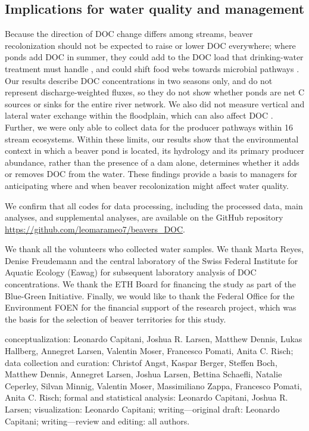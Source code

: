 \documentclass[pdflatex,sn-nature]{sn-jnl}   %
\begin{document}
\FloatBarrier
\subsection{Implications for water quality and management}

Because the direction of DOC change differs among streams, beaver recolonization should not be expected to raise or lower DOC everywhere; where ponds add DOC in summer, they could add to the DOC load that drinking-water treatment must handle \cite{leonard2022}, and could shift food webs towards microbial pathways \cite{stanley2012,xenopoulos2017}. Our results describe DOC concentrations in two seasons only, and do not represent discharge-weighted fluxes, so they do not show whether ponds are net C sources or sinks for the entire river network. We also did not measure vertical and lateral water exchange within the floodplain, which can also affect DOC \cite{larsen2021}. Further, we were only able to collect data for the producer pathways within 16 stream ecosystems. Within these limits, our results show that the environmental context in which a beaver pond is located, its hydrology and its primary producer abundance, rather than the presence of a dam alone, determines whether it adds or removes DOC from the water. These findings provide a basis to managers for anticipating where and when beaver recolonization might affect water quality.

\backmatter


We confirm that all codes for data processing, including the processed data, main analyses, and supplemental analyses, are available on the GitHub repository \url{https://github.com/leomarameo7/beavers_DOC}.


We thank all the volunteers who collected water samples. We thank Marta Reyes, Denise Freudemann and the central laboratory of the Swiss Federal Institute for Aquatic Ecology (Eawag) for subsequent laboratory analysis of DOC concentrations. We thank the ETH Board for financing the study as part of the Blue-\-Green Initiative. Finally, we would like to thank the Federal Office for the Environment FOEN for the financial support of the research project, which was the basis for the selection of beaver territories for this study.

 conceptualization: Leonardo Capitani, Joshua R. Larsen, Matthew Dennis, Lukas Hallberg, Annegret Larsen, Valentin Moser, Francesco Pomati, Anita C. Risch; data collection and curation: Christof Angst, Kaspar Berger, Steffen Boch, Matthew Dennis, Annegret Larsen, Joshua Larsen, Bettina Schaefli, Natalie Ceperley, Silvan Minnig, Valentin Moser, Massimiliano Zappa, Francesco Pomati, Anita C. Risch; formal and statistical analysis: Leonardo Capitani, Joshua R. Larsen; visualization: Leonardo Capitani; writing---original draft: Leonardo Capitani; writing---review and editing: all authors.
\end{document}
